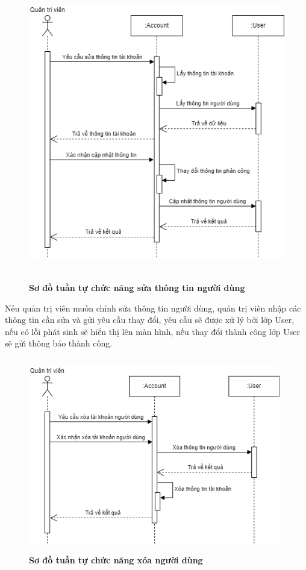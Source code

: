 \begin{figure}[H]
  \centering
  \includegraphics[width=13cm,height=13cm]{Images/sequence/sequence_manage_edit_user.png}
  \caption[Sơ đồ tuần tự chức năng sửa thông tin người dùng]{\bfseries \fontsize{12pt}{0pt}
  \selectfont Sơ đồ tuần tự chức năng sửa thông tin người dùng}
  \label{sequence_manage_edit_user} %
\end{figure}
Nếu quản trị viên muốn chỉnh sửa thông tin người dùng, quản trị viên nhập các thông tin cần sửa và gửi yêu cầu thay đổi, yêu cầu sẽ được xử lý bởi lớp User, nếu có lỗi phát sinh sẽ hiển thị lên màn hình,
nếu thay đổi thành công lớp User sẽ gửi thông báo thành công. 
\begin{figure}[H]
  \centering
  \includegraphics[width=11cm,height=8.5cm]{Images/sequence/sequence_manage_delete_user.png}
  \caption[Sơ đồ tuần tự chức năng xóa người dùng]{\bfseries \fontsize{12pt}{0pt}
  \selectfont Sơ đồ tuần tự chức năng xóa người dùng}
  \label{sequence_manage_delete_user} %
\end{figure}

